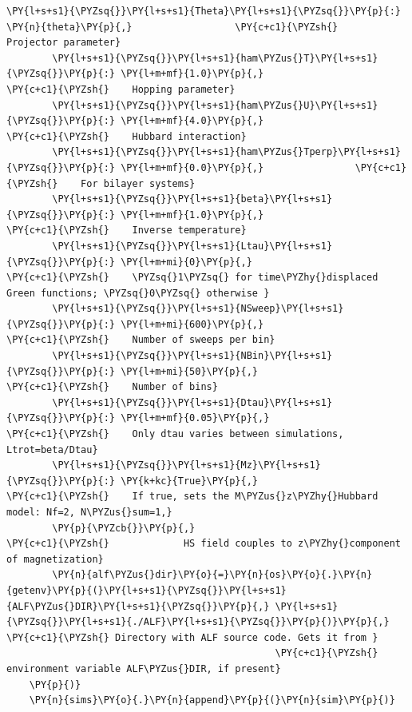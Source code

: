 \begin{tcolorbox}[breakable, size=fbox, boxrule=1pt, pad at break*=1mm,colback=cellbackground, colframe=cellborder]
\begin{Verbatim}[commandchars=\\\{\}]
        \PY{l+s+s1}{\PYZsq{}}\PY{l+s+s1}{Theta}\PY{l+s+s1}{\PYZsq{}}\PY{p}{:} \PY{n}{theta}\PY{p}{,}                  \PY{c+c1}{\PYZsh{}    Projector parameter}
        \PY{l+s+s1}{\PYZsq{}}\PY{l+s+s1}{ham\PYZus{}T}\PY{l+s+s1}{\PYZsq{}}\PY{p}{:} \PY{l+m+mf}{1.0}\PY{p}{,}                    \PY{c+c1}{\PYZsh{}    Hopping parameter}
        \PY{l+s+s1}{\PYZsq{}}\PY{l+s+s1}{ham\PYZus{}U}\PY{l+s+s1}{\PYZsq{}}\PY{p}{:} \PY{l+m+mf}{4.0}\PY{p}{,}                    \PY{c+c1}{\PYZsh{}    Hubbard interaction}
        \PY{l+s+s1}{\PYZsq{}}\PY{l+s+s1}{ham\PYZus{}Tperp}\PY{l+s+s1}{\PYZsq{}}\PY{p}{:} \PY{l+m+mf}{0.0}\PY{p}{,}                \PY{c+c1}{\PYZsh{}    For bilayer systems}
        \PY{l+s+s1}{\PYZsq{}}\PY{l+s+s1}{beta}\PY{l+s+s1}{\PYZsq{}}\PY{p}{:} \PY{l+m+mf}{1.0}\PY{p}{,}                     \PY{c+c1}{\PYZsh{}    Inverse temperature}
        \PY{l+s+s1}{\PYZsq{}}\PY{l+s+s1}{Ltau}\PY{l+s+s1}{\PYZsq{}}\PY{p}{:} \PY{l+m+mi}{0}\PY{p}{,}                       \PY{c+c1}{\PYZsh{}    \PYZsq{}1\PYZsq{} for time\PYZhy{}displaced Green functions; \PYZsq{}0\PYZsq{} otherwise }
        \PY{l+s+s1}{\PYZsq{}}\PY{l+s+s1}{NSweep}\PY{l+s+s1}{\PYZsq{}}\PY{p}{:} \PY{l+m+mi}{600}\PY{p}{,}                   \PY{c+c1}{\PYZsh{}    Number of sweeps per bin}
        \PY{l+s+s1}{\PYZsq{}}\PY{l+s+s1}{NBin}\PY{l+s+s1}{\PYZsq{}}\PY{p}{:} \PY{l+m+mi}{50}\PY{p}{,}                      \PY{c+c1}{\PYZsh{}    Number of bins}
        \PY{l+s+s1}{\PYZsq{}}\PY{l+s+s1}{Dtau}\PY{l+s+s1}{\PYZsq{}}\PY{p}{:} \PY{l+m+mf}{0.05}\PY{p}{,}                    \PY{c+c1}{\PYZsh{}    Only dtau varies between simulations, Ltrot=beta/Dtau}
        \PY{l+s+s1}{\PYZsq{}}\PY{l+s+s1}{Mz}\PY{l+s+s1}{\PYZsq{}}\PY{p}{:} \PY{k+kc}{True}\PY{p}{,}                      \PY{c+c1}{\PYZsh{}    If true, sets the M\PYZus{}z\PYZhy{}Hubbard model: Nf=2, N\PYZus{}sum=1,}
        \PY{p}{\PYZcb{}}\PY{p}{,}                               \PY{c+c1}{\PYZsh{}             HS field couples to z\PYZhy{}component of magnetization}
        \PY{n}{alf\PYZus{}dir}\PY{o}{=}\PY{n}{os}\PY{o}{.}\PY{n}{getenv}\PY{p}{(}\PY{l+s+s1}{\PYZsq{}}\PY{l+s+s1}{ALF\PYZus{}DIR}\PY{l+s+s1}{\PYZsq{}}\PY{p}{,} \PY{l+s+s1}{\PYZsq{}}\PY{l+s+s1}{./ALF}\PY{l+s+s1}{\PYZsq{}}\PY{p}{)}\PY{p}{,} \PY{c+c1}{\PYZsh{} Directory with ALF source code. Gets it from }
                                               \PY{c+c1}{\PYZsh{} environment variable ALF\PYZus{}DIR, if present}
    \PY{p}{)}
    \PY{n}{sims}\PY{o}{.}\PY{n}{append}\PY{p}{(}\PY{n}{sim}\PY{p}{)}
\end{Verbatim}
\end{tcolorbox}

